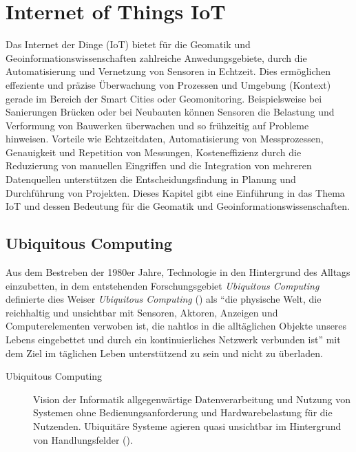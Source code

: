 \documentclass[
  11pt,
  a4paperpaper,
  oneside, openany  ,captions=tableheading
]{scrbook}
\theoremstyle{definition}
\theoremstyle{remark}
\begin{document}
\chapter{Internet of Things IoT}\label{internet-of-things-iot}

Das Internet der Dinge (IoT) bietet für die Geomatik und
Geoinformationswissenschaften zahlreiche Anwedungsgebiete, durch die
Automatisierung und Vernetzung von Sensoren in Echtzeit. Dies
ermöglichen effeziente und präzise Überwachung von Prozessen und
Umgebung (Kontext) gerade im Bereich der Smart Cities oder
Geomonitoring. Beispielsweise bei Sanierungen Brücken oder bei Neubauten
können Sensoren die Belastung und Verformung von Bauwerken überwachen
und so frühzeitig auf Probleme hinweisen. Vorteile wie Echtzeitdaten,
Automatisierung von Messprozessen, Genauigkeit und Repetition von
Messungen, Kosteneffizienz durch die Reduzierung von manuellen
Eingriffen und die Integration von mehreren Datenquellen unterstützen
die Entscheidungsfindung in Planung und Durchführung von Projekten.
Dieses Kapitel gibt eine Einführung in das Thema IoT und dessen
Bedeutung für die Geomatik und Geoinformationswissenschaften.

\section{Ubiquitous Computing}\label{ubiquitous-computing}

Aus dem Bestreben der 1980er Jahre, Technologie in den Hintergrund des
Alltags einzubetten, in dem entstehenden Forschungsgebiet
\emph{Ubiquitous Computing} definierte dies Weiser \emph{Ubiquitous
Computing} () als ``die physische
Welt, die reichhaltig und unsichtbar mit Sensoren, Aktoren, Anzeigen und
Computerelementen verwoben ist, die nahtlos in die alltäglichen Objekte
unseres Lebens eingebettet und durch ein kontinuierliches Netzwerk
verbunden ist'' mit dem Ziel im täglichen Leben unterstützend zu sein
und nicht zu überladen.

\begin{description}
\item[Ubiquitous Computing]
Vision der Informatik allgegenwärtige Datenverarbeitung und Nutzung von
Systemen ohne Bedienungsanforderung und Hardwarebelastung für die
Nutzenden. Ubiquitäre Systeme agieren quasi unsichtbar im Hintergrund
von Handlungsfelder ().
\end{description}
\end{document}
